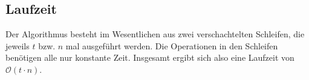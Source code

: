 \subsection{Laufzeit}
\label{sub:Laufzeit}

Der Algorithmus besteht im Wesentlichen aus zwei verschachtelten Schleifen, die jeweils $t$ bzw. $n$ mal ausgeführt werden. Die Operationen in den Schleifen benötigen alle nur konstante Zeit. Insgesamt ergibt sich also eine Laufzeit von $\mathcal{O}(t \cdot n)$.


